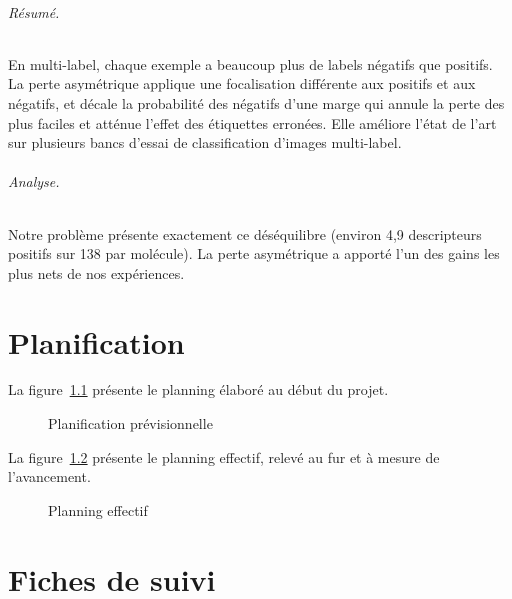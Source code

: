 \subparagraph{Résumé.}
En multi-label, chaque exemple a beaucoup plus de labels négatifs que positifs.
La perte asymétrique applique une focalisation différente aux positifs et aux négatifs, et décale la probabilité des négatifs d'une marge qui annule la perte des plus faciles et atténue l'effet des étiquettes erronées.
Elle améliore l'état de l'art sur plusieurs bancs d'essai de classification d'images multi-label.

\subparagraph{Analyse.}
Notre problème présente exactement ce déséquilibre (environ 4,9 descripteurs positifs sur 138 par molécule).
La perte asymétrique a apporté l'un des gains les plus nets de nos expériences.


\chapter{Planification}
\label{ann:Planification}

La figure~\ref{fig:PlanningPrevisionnel} présente le planning élaboré au début du projet.

\begin{figure}
   \centering
   \caption{Planification prévisionnelle}
   \label{fig:PlanningPrevisionnel}
\end{figure}

La figure~\ref{fig:PlanningEffectif} présente le planning effectif, relevé au fur et à mesure de l'avancement.

\begin{figure}
   \centering
   \caption{Planning effectif}
   \label{fig:PlanningEffectif}
\end{figure}



\chapter{Fiches de suivi}
\label{ann:FichesSuivi}

